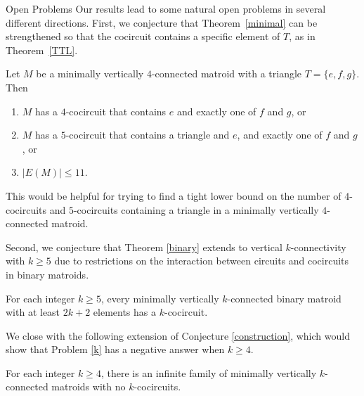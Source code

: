 \documentclass[12pt]{amsart}
\begin{document}
\begin{section}{Open Problems} \label{open}
Our results lead to some natural open problems in several different directions.
First, we conjecture that Theorem~\ref{minimal} can be strengthened so that the cocircuit contains a specific element of $T$, as in Theorem~\ref{TTL}.

\begin{conjecture} 
Let $M$ be a minimally vertically $4$-connected matroid with a triangle $T = \{e,f,g\}$. Then
\begin{enumerate}[$(1)$]
\item $M$ has a $4$-cocircuit that contains $e$ and exactly one of $f$ and $g$, or

\item $M$ has a $5$-cocircuit that contains a triangle and $e$, and exactly one of $f$ and $g$, or 

\item  $|E(M)| \le 11$.
\end{enumerate}
\end{conjecture}

This would be helpful for trying to find a tight lower bound on the number of $4$-cocircuits and $5$-cocircuits containing a triangle in a minimally vertically $4$-connected matroid.

Second, we conjecture that Theorem \ref{binary} extends to vertical $k$-connectivity with $k \ge 5$ due to restrictions on the interaction between circuits and cocircuits in binary matroids.

\begin{conjecture}
For each integer $k \ge 5$, every minimally vertically $k$-connected binary matroid with at least $2k + 2$ elements has a $k$-cocircuit.
\end{conjecture}

We close with the following extension of Conjecture \ref{construction}, which would show that Problem \ref{k} has a negative answer when $k \ge 4$.

\begin{conjecture}
For each integer $k \ge 4$, there is an infinite family of minimally vertically $k$-connected matroids with no $k$-cocircuits.
\end{conjecture}



\end{section}
\end{document}
